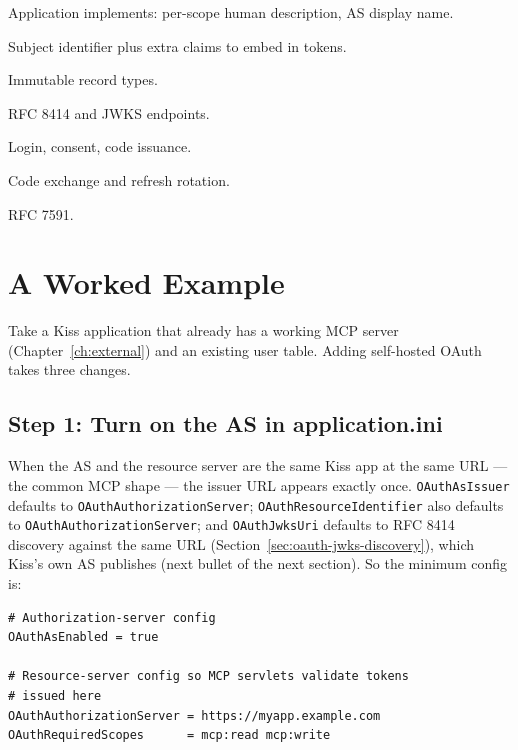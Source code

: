 \begin{description}[style=nextline]
  \item[\texttt{ConsentProvider}\index{ConsentProvider} \emph{(interface)}]  Application implements: per-scope human description, AS display name.
  \item[\texttt{AuthenticatedUser}\index{AuthenticatedUser}]  Subject identifier plus extra claims to embed in tokens.
  \item[\texttt{RegisteredClient}\index{RegisteredClient}, \texttt{Refresh\-Token}, \texttt{Authorization\-Code}]  Immutable record types.
  \item[\texttt{MetadataServlet}\index{MetadataServlet}, \texttt{JwksPublishServlet}\index{JwksPublishServlet}]  RFC 8414 and JWKS endpoints.
  \item[\texttt{AuthorizationServlet}\index{AuthorizationServlet}]  Login, consent, code issuance.
  \item[\texttt{TokenServlet}\index{TokenServlet}]  Code exchange and refresh rotation.
  \item[\texttt{DynamicClientRegistrationServlet}\index{DynamicClientRegistrationServlet@Dynamic\-Client\-Registration\-Servlet}]  RFC 7591.
\end{description}

\section{A Worked Example}
\label{sec:as-example}

Take a Kiss application that already has a working MCP server (Chapter~\ref{ch:external}) and an existing user table.  Adding self-hosted OAuth takes three changes.

\subsection{Step 1: Turn on the AS in application.ini}

When the AS and the resource server are the same Kiss app at the same URL --- the common MCP shape --- the issuer URL appears exactly once.  \texttt{OAuthAsIssuer} defaults to \texttt{OAuthAuthorizationServer}; \texttt{OAuthResourceIdentifier} also defaults to \texttt{OAuthAuthorizationServer}; and \texttt{OAuthJwksUri} defaults to RFC 8414 discovery against the same URL (Section~\ref{sec:oauth-jwks-discovery}), which Kiss's own AS publishes (next bullet of the next section).  So the minimum config is:

\begin{lstlisting}[style=ini]
# Authorization-server config
OAuthAsEnabled = true

# Resource-server config so MCP servlets validate tokens
# issued here
OAuthAuthorizationServer = https://myapp.example.com
OAuthRequiredScopes      = mcp:read mcp:write
\end{lstlisting}

